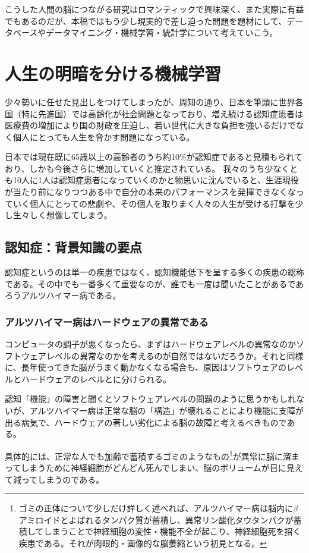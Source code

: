 こうした人間の脳につながる研究はロマンティックで興味深く、また実際に有益でもあるのだが、本稿ではもう少し現実的で差し迫った問題を題材にして、データベースやデータマイニング・機械学習・統計学について考えていこう。

\section{人生の明暗を分ける機械学習}
少々勢いに任せた見出しをつけてしまったが、周知の通り、日本を筆頭に世界各国（特に先進国）では高齢化が社会問題となっており、増え続ける認知症患者は医療費の増加により国の財政を圧迫し、若い世代に大きな負担を強いるだけでなく個人にとっても人生を脅かす問題になっている。

日本では現在既に65歳以上の高齢者のうち約10\%が認知症であると見積もられており、しかも今後さらに増加していくと推定されている。
我々のうち少なくとも10人に1人は認知症患者になっていくのかと物思いに沈んでいると、生涯現役が当たり前になりつつある中で自分の本来のパフォーマンスを発揮できなくなっていく個人にとっての悲劇や、その個人を取りまく人々の人生が受ける打撃を少し生々しく想像してしまう。

\subsection{認知症：背景知識の要点}
認知症というのは単一の疾患ではなく、認知機能低下を呈する多くの疾患の総称である。その中でも一番多くて重要なのが、誰でも一度は聞いたことがあるであろうアルツハイマー病である。

\subsubsection{アルツハイマー病はハードウェアの異常である}
コンピュータの調子が悪くなったら、まずはハードウェアレベルの異常なのかソフトウェアレベルの異常なのかを考えるのが自然ではないだろうか。それと同様に、長年使ってきた脳がうまく動かなくなる場合も、原因はソフトウェアのレベルとハードウェアのレベルとに分けられる。

認知「機能」の障害と聞くとソフトウェアレベルの問題のように思うかもしれないが、アルツハイマー病は正常な脳の「構造」が壊れることにより機能に支障が出る病気で、ハードウェアの著しい劣化による脳の故障と考えるべきものである。

具体的には、正常な人でも加齢で蓄積するゴミのようなもの\footnote{ゴミの正体について少しだけ詳しく述べれば、アルツハイマー病は脳内に$\beta$アミロイドとよばれるタンパク質が蓄積し、異常リン酸化タウタンパクが蓄積してしまうことで神経細胞の変性・機能不全が起こり、神経細胞死を招く疾患である。それが肉眼的・画像的な脳萎縮という初見となる。}が異常に脳に溜まってしまうために神経細胞がどんどん死んでしまい、脳のボリュームが目に見えて減ってしまうのである。

